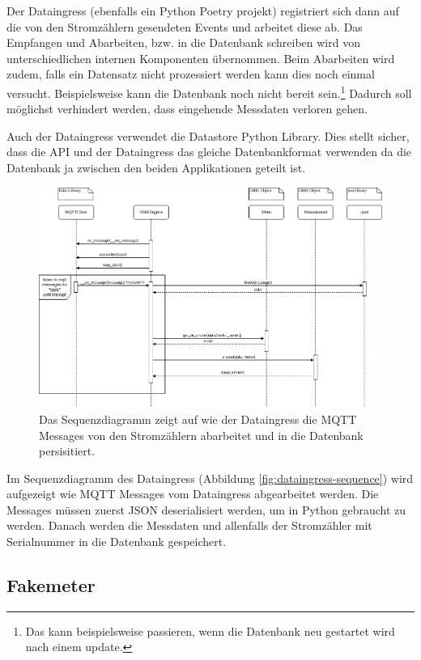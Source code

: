 Der Dataingress (ebenfalls ein Python Poetry projekt) registriert sich dann auf die von
den Stromzählern gesendeten Events und arbeitet diese ab. Das Empfangen und Abarbeiten, bzw.
in die Datenbank schreiben wird von unterschiedlichen internen Komponenten übernommen.
Beim Abarbeiten wird zudem, falls ein Datensatz nicht prozessiert werden kann dies noch
einmal versucht. Beispielsweise kann die Datenbank noch nicht bereit sein.\footnote{
    Das kann beispielsweise passieren, wenn die Datenbank neu gestartet wird nach einem update.
}
Dadurch soll möglichst verhindert werden, dass eingehende Messdaten verloren gehen.

Auch der Dataingress verwendet die Datastore Python Library. Dies stellt sicher,
dass die \ac{API} und der Dataingress das gleiche Datenbankformat verwenden da
die Datenbank ja zwischen den beiden Applikationen geteilt ist.

\begin{figure}[h]
    \centering
    \includegraphics[width=1.0\textwidth]{gfx/dataingress-sequence-no-err}
    \caption{
        Das Sequenzdiagramm zeigt auf wie der Dataingress die \ac{MQTT} Messages
        von den Stromzählern abarbeitet und in die Datenbank persisitiert.
    }
    \label{fig:dataingress-sequence-no-err}
\end{figure}

Im Sequenzdiagramm des Dataingress (Abbildung \ref{fig:dataingress-sequence}) wird aufgezeigt
wie \ac{MQTT} Messages vom Dataingress abgearbeitet werden.
Die Messages müssen zuerst \ac{JSON} deserialisiert werden, um in Python
gebraucht zu werden. Danach werden die Messdaten und allenfalls der
Stromzähler mit Serialnummer in die Datenbank gespeichert.

\subsection{Fakemeter}

